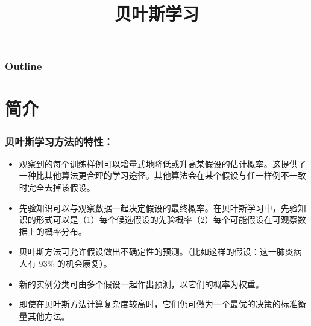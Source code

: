 \documentclass{beamer}
\title{贝叶斯学习}
\author{}
\date{}
\begin{document}
\maketitle

\begin{frame}
\frametitle{Outline}
\setcounter{tocdepth}{3}
\tableofcontents
\end{frame}











\section{简介}
\label{sec-1}
\begin{frame}
\frametitle{贝叶斯学习方法的特性：}
\label{sec-1-1}

\begin{itemize}
\item 观察到的每个训练样例可以增量式地降低或升高某假设的估计概率。这提供了一种比其他算法更合理的学习途径。其他算法会在某个假设与任一样例不一致时完全去掉该假设。
\item 先验知识可以与观察数据一起决定假设的最终概率。在贝叶斯学习中，先验知识的形式可以是（1）每个候选假设的先验概率（2）每个可能假设在可观察数据上的概率分布。
\item 贝叶斯方法可允许假设做出不确定性的预测。（比如这样的假设：这一肺炎病人有 93\% 的机会康复）。
\item 新的实例分类可由多个假设一起作出预测，以它们的概率为权重。
\item 即使在贝叶斯方法计算复杂度较高时，它们仍可做为一个最优的决策的标准衡量其他方法。
\end{itemize}
\end{frame}
\end{document}
